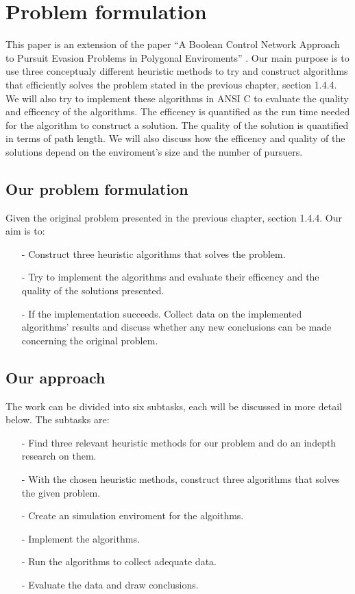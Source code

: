 \chapter{Problem formulation}
This paper is an extension of the paper ``A Boolean Control Network Approach to Pursuit Evasion Problems in Polygonal Enviroments'' \cite{paper1}. Our main purpose is to use three conceptualy different heuristic methods to try and construct algorithms that efficiently solves the problem stated in the previous chapter, section 1.4.4. We will also try to implement these algorithms in ANSI C to evaluate the quality and efficency of the algorithms. The efficency is quantified as the run time needed for the algorithm to construct a solution. The quality of the solution is quantified in terms of path length. We will also discuss how the efficency and quality of the solutions depend on the enviroment's size and the number of pursuers.

\section{Our problem formulation}
Given the original problem presented in the previous chapter, section 1.4.4. Our aim is to:
\begin{enumerate}
\item[-] Construct three heuristic algorithms that solves the problem.
\item[-] Try to implement the algorithms and evaluate their efficency and the quality of the solutions presented.
\item[-] If the implementation succeeds. Collect data on the implemented algorithms' results and discuss whether any new conclusions can be made concerning the original problem.
\end{enumerate}

\section{Our approach}
The work can be divided into six subtasks, each will be discussed in more detail below. The subtasks are:
\begin{enumerate}
\item[-] Find three relevant heuristic methods for our problem and do an indepth research on them.
\item[-] With the chosen heuristic methods, construct three algorithms that solves the given problem.
\item[-] Create an simulation enviroment for the algoithms.
\item[-] Implement the algorithms.
\item[-] Run the algorithms to collect adequate data.
\item[-] Evaluate the data and draw conclusions.
\end{enumerate}

